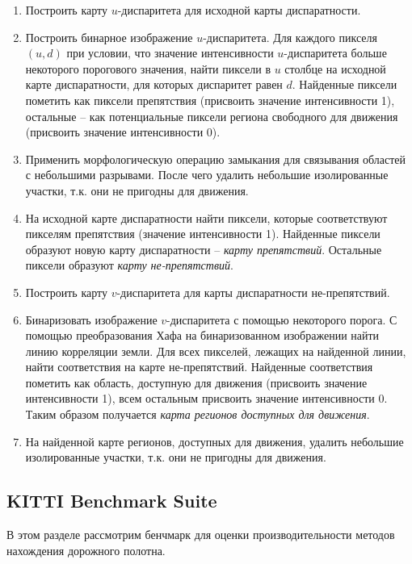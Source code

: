 \documentclass[oneside,final,12pt]{scrartcl}
\begin{document}
	 		\begin{enumerate}
	 			\item Построить карту \(u\)-диспаритета для исходной карты диспаратности.

	 			\item Построить бинарное изображение \(u\)-диспаритета. Для каждого пикселя \(\left(u, d\right)\) при условии, что значение интенсивности \(u\)-диспаритета больше некоторого порогового значения, найти пиксели в \(u\) столбце на исходной карте диспаратности, для которых диспаритет равен \(d\). Найденные пиксели пометить как пиксели препятствия (присвоить значение интенсивности 1), остальные -- как потенциальные пиксели региона свободного для движения (присвоить значение интенсивности 0).

	 			\item Применить морфологическую операцию замыкания для связывания областей с небольшими разрывами. После чего удалить небольшие изолированные участки, т.к. они не пригодны для движения.

	 			\item На исходной карте диспаратности найти пиксели, которые соответствуют пикселям препятствия (значение интенсивности 1). Найденные пиксели образуют новую карту диспаратности -- \textit{карту препятствий}. Остальные пиксели образуют \textit{карту не-препятствий}.

	 			\item Построить карту \(v\)-диспаритета для карты диспаратности не-препятствий.

	 			\item Бинаризовать изображение \(v\)-диспаритета с помощью некоторого порога. С помощью преобразования Хафа на  бинаризованном изображении найти линию корреляции земли. Для всех пикселей, лежащих на найденной линии, найти соответствия на карте не-препятствий. Найденные соответствия пометить как область, доступную для движения (присвоить значение интенсивности 1), всем остальным присвоить значение интенсивности 0. Таким образом получается \textit{карта регионов доступных для движения}.

	 			\item  На найденной карте регионов, доступных для движения, удалить небольшие изолированные участки, т.к. они не пригодны для движения.
 			\end{enumerate}


	 	\subsection{KITTI Benchmark Suite}
	 	\label{subsec:benchmark}
	 		В этом разделе рассмотрим бенчмарк для оценки производительности методов нахождения дорожного полотна.
\end{document}
